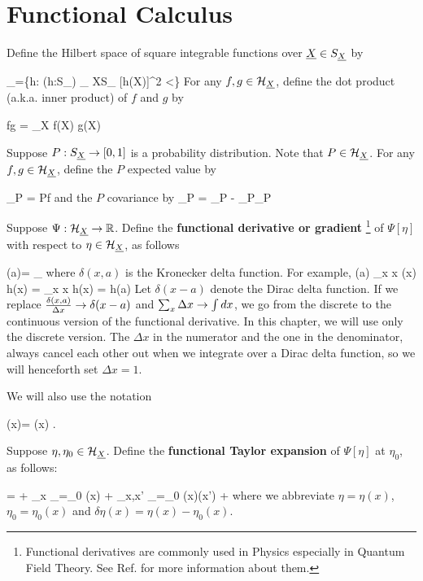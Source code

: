 \section{Functional Calculus}

Define
the Hilbert space of square integrable functions over ${\underline{X}}\in S_{\underline{X}}$
by

\beq
\calh_\rvX =\{h: (h:S_\rvX\rarrow \RR) 
\sum_{ X\in S_ \rvX}[h(X)]^2 <\infty\}
\eeq
For any $f,g\in {\cal H}_{\underline{X}}$,
define the dot product (a.k.a. inner product)
of $f$ and $g$ by

\beq
f\cdot g = \sum_X f(X) g(X)
\eeq


Suppose $P:S_{\underline{X}}\rightarrow [0,1]$
is a probability distribution.
Note that $P\in{\cal H}_{\underline{X}}$.
For any $f,g\in{\cal H}_{\underline{X}}$,
define the $P$ expected value by

\beq
{}_P = P\cdot f
\eeq
and the $P$ covariance by
\beq
{}_P =
_P - _P_P
\eeq

Suppose $\Psi:{\cal H}_{\underline{X}}\rightarrow { \mathbb{R}}$.
Define the
{\bf functional derivative or gradient }\footnote{
Functional derivatives are commonly used in Physics
especially in Quantum Field Theory.
See Ref.\cite{wiki-func-deri} for more
information about them.}
of $\Psi[\eta]$ with respect to $\eta\in{\cal H}_{\underline{X}}$, as follows


\beq
\frac{\delta \Psi[\eta]}
{\delta \eta(a)}=
\lim_{\eps{}}
{\eps}
\eeq
where $\delta(x,a)$ is the Kronecker delta function.
For example,
\beq
\frac{\delta}
{\delta \eta(a)}
\sum_x \Delta x\; \eta(x) h(x)
=
\sum_x \Delta x  h(x)
=
h(a)
\eeq
 Let
$\delta(x-a)$ denote the Dirac delta function. If we replace
$\frac{\delta(x,a)}{\Delta x}\rightarrow\delta(x-a)$
and $\sum_x \Delta x\rightarrow \int dx$, we go
from the discrete to the continuous version
of the functional derivative.
In this chapter, we will use only the discrete version.
The $\Delta x$ in the numerator
and the one in the denominator, always cancel
each other out
when we integrate over a Dirac delta function, so we will
henceforth set
$\Delta x=1$.

We will also use the notation

\beq
\dpsi[\eta](x)=
\frac{\delta \Psi[\eta]}
{\delta \eta(x)}
\;.
\eeq

Suppose $\eta, \eta_0\in {\cal H}_{\underline{X}}$. Define the
{\bf functional Taylor expansion} of $\Psi[\eta]$
at $\eta_0$, as follows:

\beq
\Psi[\eta]=
\Psi[\eta_0]
+ \sum_x
_{\eta=\eta_0}
\delta\eta(x)
+
\sum_{x,x'}
_{\eta=\eta_0}
\delta\eta(x)\delta\eta(x')
+
\cdots
\eeq
where we abbreviate
$ \eta =\eta(x)$,
$\eta_0=\eta_0(x)$ and $\delta \eta(x) = \eta(x)-\eta_0(x)$.



